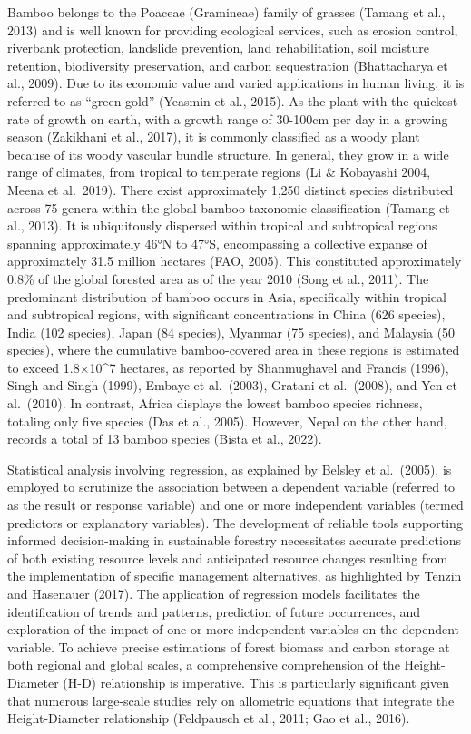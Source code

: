 \documentclass[preprint, 3p,
authoryear]{elsarticle} %
\begin{document}
Bamboo belongs to the Poaceae (Gramineae) family of grasses (Tamang et
al., 2013) and is well known for providing ecological services, such as
erosion control, riverbank protection, landslide prevention, land
rehabilitation, soil moisture retention, biodiversity preservation, and
carbon sequestration (Bhattacharya et al., 2009). Due to its economic
value and varied applications in human living, it is referred to as
``green gold'' (Yeasmin et al., 2015). As the plant with the quickest
rate of growth on earth, with a growth range of 30-100cm per day in a
growing season (Zakikhani et al., 2017), it is commonly classified as a
woody plant because of its woody vascular bundle structure. In general,
they grow in a wide range of climates, from tropical to temperate
regions (Li \& Kobayashi 2004, Meena et al.~2019). There exist
approximately 1,250 distinct species distributed across 75 genera within
the global bamboo taxonomic classification (Tamang et al., 2013). It is
ubiquitously dispersed within tropical and subtropical regions spanning
approximately 46°N to 47°S, encompassing a collective expanse of
approximately 31.5 million hectares (FAO, 2005). This constituted
approximately 0.8\% of the global forested area as of the year 2010
(Song et al., 2011). The predominant distribution of bamboo occurs in
Asia, specifically within tropical and subtropical regions, with
significant concentrations in China (626 species), India (102 species),
Japan (84 species), Myanmar (75 species), and Malaysia (50 species),
where the cumulative bamboo-covered area in these regions is estimated
to exceed 1.8×10\^{}7 hectares, as reported by Shanmughavel and Francis
(1996), Singh and Singh (1999), Embaye et al.~(2003), Gratani et
al.~(2008), and Yen et al.~(2010). In contrast, Africa displays the
lowest bamboo species richness, totaling only five species (Das et al.,
2005). However, Nepal on the other hand, records a total of 13 bamboo
species (Bista et al., 2022).

Statistical analysis involving regression, as explained by Belsley et
al.~(2005), is employed to scrutinize the association between a
dependent variable (referred to as the result or response variable) and
one or more independent variables (termed predictors or explanatory
variables). The development of reliable tools supporting informed
decision-making in sustainable forestry necessitates accurate
predictions of both existing resource levels and anticipated resource
changes resulting from the implementation of specific management
alternatives, as highlighted by Tenzin and Hasenauer (2017). The
application of regression models facilitates the identification of
trends and patterns, prediction of future occurrences, and exploration
of the impact of one or more independent variables on the dependent
variable. To achieve precise estimations of forest biomass and carbon
storage at both regional and global scales, a comprehensive
comprehension of the Height-Diameter (H-D) relationship is imperative.
This is particularly significant given that numerous large-scale studies
rely on allometric equations that integrate the Height-Diameter
relationship (Feldpausch et al., 2011; Gao et al., 2016).
\end{document}
